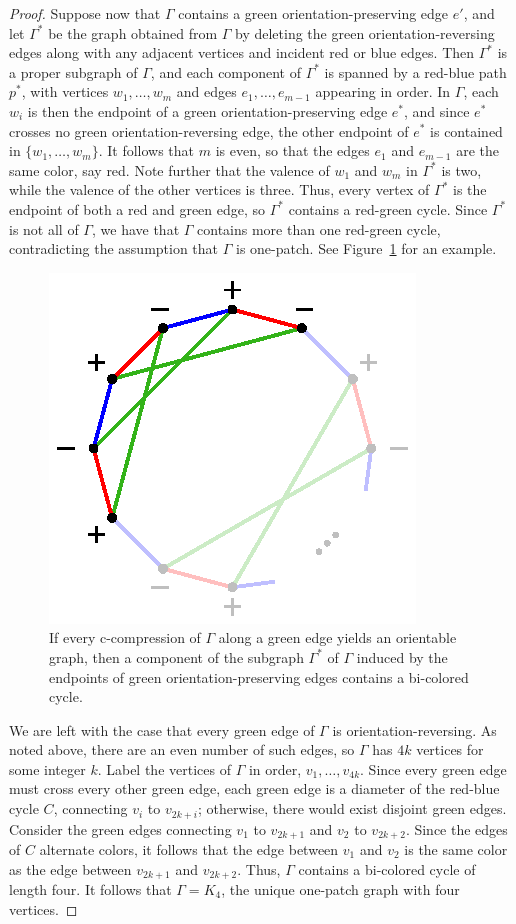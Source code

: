 \documentclass[11pt, oneside]{amsart}
\theoremstyle{theorem}
\theoremstyle{definition}
\theoremstyle{theorem}
\begin{document}
\begin{proof}
Suppose now that $\Gamma$ contains a green orientation-preserving edge $e'$, and let $\Gamma^*$ be the graph obtained from $\Gamma$ by deleting the green orientation-reversing edges along with any adjacent vertices and incident red or blue edges.  Then $\Gamma^*$ is a proper subgraph of $\Gamma$, and each component of $\Gamma^*$ is spanned by a red-blue path $p^*$, with vertices $w_1,\dots,w_m$ and edges $e_1,\dots,e_{m-1}$ appearing in order.  In $\Gamma$, each $w_i$ is then the endpoint of a green orientation-preserving edge $e^*$, and since $e^*$ crosses no green orientation-reversing edge, the other endpoint of $e^*$ is contained in $\{w_1,\dots,w_m\}$.  It follows that $m$ is even, so that the edges $e_1$ and $e_{m-1}$ are the same color, say red.  Note further that the valence of $w_1$ and $w_m$ in $\Gamma^*$ is two, while the valence of the other vertices is three.  Thus, every vertex of $\Gamma^*$ is the endpoint of both a red and green edge, so $\Gamma^*$ contains a red-green cycle.  Since $\Gamma^*$ is not all of $\Gamma$, we have that $\Gamma$ contains more than one red-green cycle, contradicting the assumption that $\Gamma$ is one-patch.  See Figure~\ref{oedge} for an example.

\begin{figure}[h!]
 \centering
  \includegraphics[width=.3\linewidth]{ugh3.eps}
\caption{If every c-compression of $\Gamma$ along a green edge yields an orientable graph, then a component of the subgraph $\Gamma^*$ of $\Gamma$ induced by the endpoints of green orientation-preserving edges contains a bi-colored cycle.}
\label{oedge}
\end{figure}


We are left with the case that every green edge of $\Gamma$ is orientation-reversing.  As noted above, there are an even number of such edges, so  $\Gamma$ has $4k$ vertices for some integer $k$.  Label the vertices of $\Gamma$ in order, $v_1,\dots,v_{4k}$.  Since every green edge must cross every other green edge, each green edge is a diameter of the red-blue cycle $C$, connecting $v_i$ to $v_{2k+i}$; otherwise, there would exist disjoint green edges.  Consider the green edges connecting $v_1$ to $v_{2k+1}$ and $v_2$ to $v_{2k+2}$.  Since the edges of $C$ alternate colors, it follows that the edge between $v_1$ and $v_2$ is the same color as the edge between $v_{2k+1}$ and $v_{2k+2}$.  Thus, $\Gamma$ contains a bi-colored cycle of length four.  It follows that $\Gamma =K_4$, the unique one-patch graph with four vertices.
\end{proof}
\end{document}
